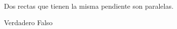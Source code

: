 Dos rectas que tienen la misma pendiente son paralelas.

\begin{oneparchoices}
    \CorrectChoice Verdadero
    \choice Falso
\end{oneparchoices}
